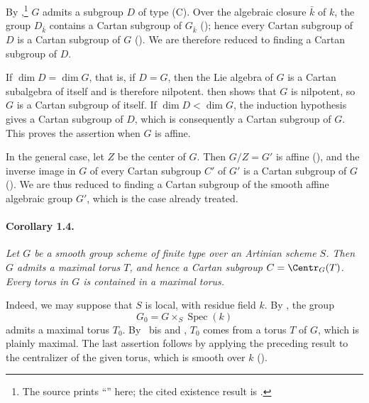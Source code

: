 By ,\footnote{The source prints ``'' here; the cited
existence result is .} \(G\) admits a subgroup \(D\) of
type \textup{(C)}. Over the algebraic closure \(\bar k\) of \(k\),
the group \(D_{\bar k}\) contains a Cartan subgroup of
\(G_{\bar k}\) \textup{()}; hence every Cartan subgroup
of \(D\) is a Cartan subgroup of \(G\) \textup{()}.
We are therefore reduced to finding a Cartan subgroup of \(D\).

If \(\dim D=\dim G\), that is, if \(D=G\), then the Lie algebra of
\(G\) is a Cartan subalgebra of itself and is therefore nilpotent.
 then shows that \(G\) is nilpotent, so \(G\) is a Cartan
subgroup of itself. If \(\dim D<\dim G\), the induction hypothesis
gives a Cartan subgroup of \(D\), which is consequently a Cartan
subgroup of \(G\). This proves the assertion when \(G\) is affine.

In the general case, let \(Z\) be the center of \(G\). Then
\(G/Z=G'\) is affine \textup{()}, and the inverse image in
\(G\) of every Cartan subgroup \(C'\) of \(G'\) is a Cartan
subgroup of \(G\) \textup{()}. We are thus reduced to
finding a Cartan subgroup of the smooth affine algebraic group
\(G'\), which is the case already treated.

\paragraph{\textbf{Corollary 1.4.}}
\emph{Let \(G\) be a smooth group scheme of finite type over an
Artinian scheme \(S\). Then \(G\) admits a maximal torus \(T\), and
hence a Cartan subgroup \(C=\Centr_G(T)\). Every torus in \(G\) is
contained in a maximal torus.}

Indeed, we may suppose that \(S\) is local, with residue field
\(k\). By , the group
\[
  G_0=G\times_S\operatorname{Spec}(k)
\]
admits a maximal torus \(T_0\). By ~bis and , \(T_0\)
comes from a torus \(T\) of \(G\), which is plainly maximal. The
last assertion follows by applying the preceding result to the
centralizer of the given torus, which is smooth over \(k\)
\textup{()}.


